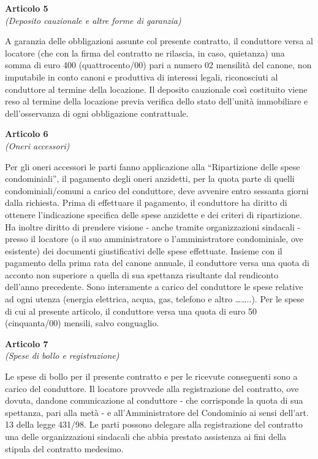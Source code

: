 \documentclass{contratto}
\begin{document}
\begin{center}
\textbf{\Large Articolo 5}\\
\textit{(Deposito cauzionale e altre forme di garanzia)}
\end{center}
A garanzia delle obbligazioni assunte col presente contratto, il conduttore versa al locatore (che con la firma del contratto ne rilascia, in caso, quietanza) una somma di euro 400 (quattrocento/00) pari a numero 02 mensilità del canone, non imputabile in conto canoni e produttiva di interessi legali, riconosciuti al conduttore al termine della locazione. Il deposito cauzionale così costituito viene reso al termine della locazione previa verifica dello stato dell'unità immobiliare e dell'osservanza di ogni obbligazione contrattuale. 

\begin{center}
\textbf{\Large Articolo 6}\\
\textit{(Oneri accessori)}
\end{center}
Per gli oneri accessori le parti fanno applicazione alla “Ripartizione delle spese condominiali”, il pagamento degli oneri anzidetti, per la quota parte di quelli condominiali/comuni a carico del conduttore, deve avvenire entro sessanta giorni dalla richiesta. Prima di effettuare il pagamento, il conduttore ha diritto di ottenere l'indicazione specifica delle spese anzidette e dei criteri di ripartizione. Ha inoltre diritto di prendere visione - anche tramite organizzazioni sindacali - presso il locatore (o il suo amministratore o l'amministratore condominiale, ove esistente) dei documenti giustificativi delle spese effettuate. Insieme con il pagamento della prima rata del canone annuale, il conduttore versa  una quota di acconto non superiore a quella di sua spettanza risultante dal rendiconto dell'anno precedente. Sono interamente a carico del conduttore le spese relative ad ogni utenza (energia elettrica, acqua, gas, telefono e altro ……..). Per le spese di cui al presente articolo, il conduttore versa una quota di euro 50 (cinquanta/00) mensili, salvo conguaglio. 

\begin{center}
\textbf{\Large Articolo 7}\\
\textit{(Spese di bollo e registrazione)}
\end{center}
Le spese di bollo per il presente contratto e per le ricevute conseguenti sono a carico del conduttore. Il locatore provvede alla registrazione del contratto, ove dovuta, dandone comunicazione al conduttore - che corrisponde la quota di sua spettanza, pari alla metà - e all’Amministratore del Condominio ai sensi dell’art. 13 della legge 431/98. Le parti possono delegare alla registrazione del contratto una delle organizzazioni sindacali che abbia prestato assistenza ai fini della stipula del contratto medesimo.
\end{document}
